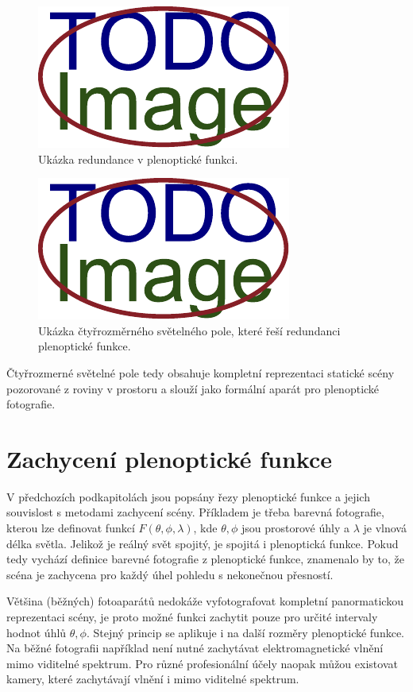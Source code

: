 \begin{figure}[h]
  \centering
  \includegraphics[width=.4\textwidth]{obrazky-figures/placeholder.pdf}
	\caption{Ukázka redundance v plenoptické funkci.}
	\label{redundance}
\end{figure}

\begin{figure}[h]
  \centering
  \includegraphics[width=.4\textwidth]{obrazky-figures/placeholder.pdf}
	\caption{Ukázka čtyřrozměrného světelného pole, které řeší redundanci plenoptické funkce.}
	\label{neredundance}
\end{figure}

Čtyřrozmerné světelné pole tedy obsahuje kompletní reprezentaci statické scény pozorované z roviny v prostoru a slouží jako formální aparát pro plenoptické fotografie.

\section{Zachycení plenoptické funkce}
V předchozích podkapitolách jsou popsány řezy plenoptické funkce a jejich souvislost s metodami zachycení scény.
Příkladem je třeba barevná fotografie, kterou lze definovat funkcí $F(\theta, \phi, \lambda)$, kde $\theta, \phi$ jsou prostorové úhly a $\lambda$ je vlnová délka světla.
Jelikož je reálný svět spojitý, je spojitá i plenoptická funkce.
Pokud tedy vychází definice barevné fotografie z plenoptické funkce, znamenalo by to, že scéna je zachycena pro každý úhel pohledu s nekonečnou přesností.

Většina (běžných) fotoaparátů nedokáže vyfotografovat kompletní panormatickou reprezentaci scény, je proto možné funkci zachytit pouze pro určité intervaly hodnot úhlů $\theta, \phi$.
Stejný princip se aplikuje i na další rozměry plenoptické funkce.
Na běžné fotografii například není nutné zachytávat elektromagnetické vlnění mimo viditelné spektrum.
Pro různé profesionální účely naopak můžou existovat kamery, které zachytávají vlnění i mimo viditelné spektrum.

